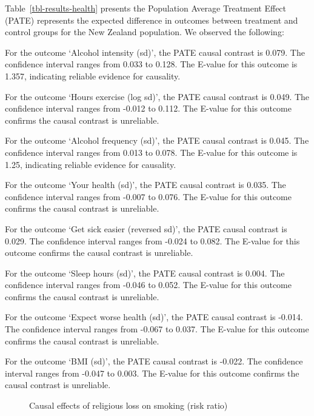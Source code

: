 \documentclass[
  singlecolumn,
  9pt]{article}
\begin{document}
Table~\ref{tbl-results-health} presents the Population Average Treatment
Effect (PATE) represents the expected difference in outcomes between
treatment and control groups for the New Zealand population. We observed
the following:

For the outcome `Alcohol intensity (sd)', the PATE causal contrast is
0.079. The confidence interval ranges from 0.033 to 0.128. The E-value
for this outcome is 1.357, indicating reliable evidence for causality.

For the outcome `Hours exercise (log sd)', the PATE causal contrast is
0.049. The confidence interval ranges from -0.012 to 0.112. The E-value
for this outcome confirms the causal contrast is unreliable.

For the outcome `Alcohol frequency (sd)', the PATE causal contrast is
0.045. The confidence interval ranges from 0.013 to 0.078. The E-value
for this outcome is 1.25, indicating reliable evidence for causality.

For the outcome `Your health (sd)', the PATE causal contrast is 0.035.
The confidence interval ranges from -0.007 to 0.076. The E-value for
this outcome confirms the causal contrast is unreliable.

For the outcome `Get sick easier (reversed sd)', the PATE causal
contrast is 0.029. The confidence interval ranges from -0.024 to 0.082.
The E-value for this outcome confirms the causal contrast is unreliable.

For the outcome `Sleep hours (sd)', the PATE causal contrast is 0.004.
The confidence interval ranges from -0.046 to 0.052. The E-value for
this outcome confirms the causal contrast is unreliable.

For the outcome `Expect worse health (sd)', the PATE causal contrast is
-0.014. The confidence interval ranges from -0.067 to 0.037. The E-value
for this outcome confirms the causal contrast is unreliable.

For the outcome `BMI (sd)', the PATE causal contrast is -0.022. The
confidence interval ranges from -0.047 to 0.003. The E-value for this
outcome confirms the causal contrast is unreliable.

\begin{figure}


\caption{\label{fig-results-health-rr}Causal effects of religious loss
on smoking (risk ratio)}

\end{figure}%
\end{document}
